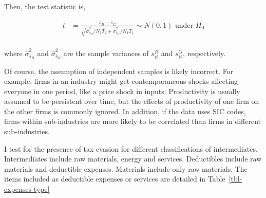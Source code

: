 \documentclass[
  12pt]{article}
\theoremstyle{definition}
\theoremstyle{remark}
\begin{document}
Then, the test statistic is,

\[
\begin{aligned}  
  t &= \frac{\bar s_B - \bar s_G}{\sqrt{\hat\sigma^2_{\bar s_B}/N_2T_2 + \hat\sigma^2_{\bar s_G}/N_1T_1}} \sim N(0,1) \text{ under } H_0\\
\end{aligned}
\]

where \(\hat\sigma^2_{\bar s_B}\) and \(\hat\sigma^2_{\bar s_G}\) are
the sample variances of \(s_{it}^B\) and \(s_{it}^G\), respectively.

Of course, the assumption of independent samples is likely incorrect.
For example, firms in an industry might get contemporaneous shocks
affecting everyone in one period, like a price shock in inputs.
Productivity is usually assumed to be persistent over time, but the
effects of productivity of one firm on the other firms is commonly
ignored. In addition, if the data uses SIC codes, firms within
sub-industries are more likely to be correlated than firms in different
sub-industries.

I test for the presence of tax evasion for different classifications of
intermediates. Intermediates include raw materials, energy and services.
Deductibles include raw materials and deductible expenses. Materials
include only raw materials. The items included as deductible expenses or
services are detailed in Table~\ref{tbl-expenses-type}
\end{document}

